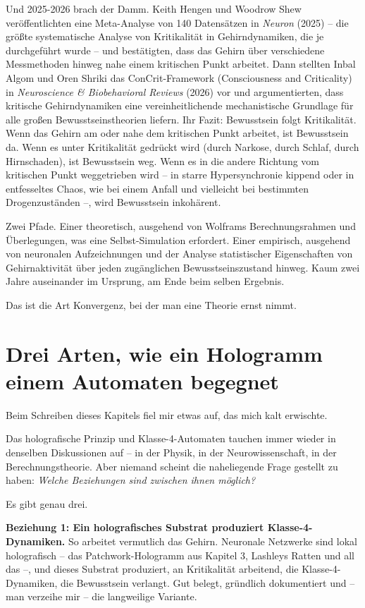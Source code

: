 \documentclass[11pt, twoside, openright]{book}
\begin{document}
Und 2025-2026 brach der Damm. Keith Hengen und Woodrow Shew veröffentlichten eine Meta-Analyse von 140 Datensätzen in \textit{Neuron} (2025) -- die größte systematische Analyse von Kritikalität in Gehirndynamiken, die je durchgeführt wurde -- und bestätigten, dass das Gehirn über verschiedene Messmethoden hinweg nahe einem kritischen Punkt arbeitet. Dann stellten Inbal Algom und Oren Shriki das ConCrit-Framework (Consciousness and Criticality) in \textit{Neuroscience \& Biobehavioral Reviews} (2026) vor und argumentierten, dass kritische Gehirndynamiken eine vereinheitlichende mechanistische Grundlage für alle großen Bewusstseinstheorien liefern. Ihr Fazit: Bewusstsein folgt Kritikalität. Wenn das Gehirn am oder nahe dem kritischen Punkt arbeitet, ist Bewusstsein da. Wenn es unter Kritikalität gedrückt wird (durch Narkose, durch Schlaf, durch Hirnschaden), ist Bewusstsein weg. Wenn es in die andere Richtung vom kritischen Punkt weggetrieben wird -- in starre Hypersynchronie kippend oder in entfesseltes Chaos, wie bei einem Anfall und vielleicht bei bestimmten Drogenzuständen --, wird Bewusstsein inkohärent.

Zwei Pfade. Einer theoretisch, ausgehend von Wolframs Berechnungsrahmen und Überlegungen, was eine Selbst-Simulation erfordert. Einer empirisch, ausgehend von neuronalen Aufzeichnungen und der Analyse statistischer Eigenschaften von Gehirnaktivität über jeden zugänglichen Bewusstseinszustand hinweg. Kaum zwei Jahre auseinander im Ursprung, am Ende beim selben Ergebnis.

Das ist die Art Konvergenz, bei der man eine Theorie ernst nimmt.

\section*{Drei Arten, wie ein Hologramm einem Automaten begegnet}

Beim Schreiben dieses Kapitels fiel mir etwas auf, das mich kalt erwischte.

Das holografische Prinzip und Klasse-4-Automaten tauchen immer wieder in denselben Diskussionen auf -- in der Physik, in der Neurowissenschaft, in der Berechnungstheorie. Aber niemand scheint die naheliegende Frage gestellt zu haben: \textit{Welche Beziehungen sind zwischen ihnen möglich?}

Es gibt genau drei.

\textbf{Beziehung 1: Ein holografisches Substrat produziert Klasse-4-Dynamiken.} So arbeitet vermutlich das Gehirn. Neuronale Netzwerke sind lokal holografisch -- das Patchwork-Hologramm aus Kapitel 3, Lashleys Ratten und all das --, und dieses Substrat produziert, an Kritikalität arbeitend, die Klasse-4-Dynamiken, die Bewusstsein verlangt. Gut belegt, gründlich dokumentiert und -- man verzeihe mir -- die langweilige Variante.
\end{document}

